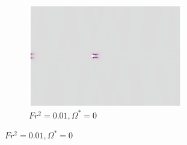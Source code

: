 \begin{figure}
\begin{subfigure}[b]{0.32\textwidth}
        \includegraphics[width=\textwidth]{images/circle/av0fr0p1.png}
        \caption{$Fr^2 = 0.01, \Omega^{\ast} = 0$}
        \label{fig:av0frs0p01}
    \end{subfigure}


\end{figure}
